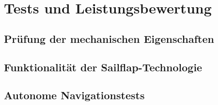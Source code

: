

\chapter{Tests und Leistungsbewertung}
\label{chap:tests}


\section{Prüfung der mechanischen Eigenschaften}

\section{Funktionalität der Sailflap-Technologie}

\section{Autonome Navigationstests}
